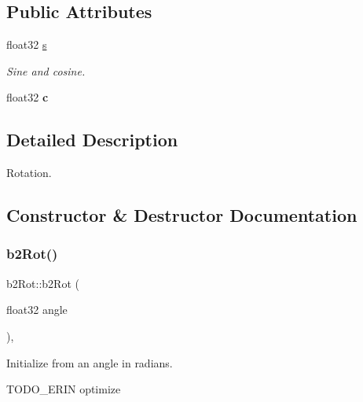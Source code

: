 \subsection*{Public Attributes}
\begin{DoxyCompactItemize}
\item 
\mbox{\label{structb2Rot_a15725ce0a89cc735ad90687b4c0f4dce}} 
float32 \hyperlink{structb2Rot_a15725ce0a89cc735ad90687b4c0f4dce}{s}
\begin{DoxyCompactList}\small\item\em Sine and cosine. \end{DoxyCompactList}\item 
\mbox{\label{structb2Rot_af23e5d31889dcb806ce46ce55aa81261}} 
float32 {\bfseries c}
\end{DoxyCompactItemize}


\subsection{Detailed Description}
Rotation. 

\subsection{Constructor \& Destructor Documentation}
\mbox{\label{structb2Rot_aa40dda6d390a2f54c793c63027a9b46e}} 
\subsubsection{\texorpdfstring{b2\+Rot()}{b2Rot()}\hspace{0.1cm}{\footnotesize\ttfamily [1/2]}}
{\footnotesize\ttfamily b2\+Rot\+::b2\+Rot (\begin{DoxyParamCaption}\item[{float32}]{angle }\end{DoxyParamCaption})\hspace{0.3cm}{\ttfamily [inline]}, {\ttfamily [explicit]}}



Initialize from an angle in radians. 

T\+O\+D\+O\+\_\+\+E\+R\+IN optimize \mbox{\label{structb2Rot_aa40dda6d390a2f54c793c63027a9b46e}} 
